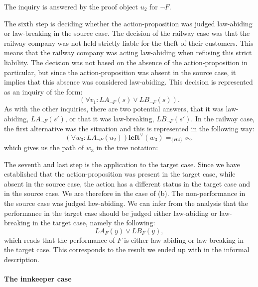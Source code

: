 			\noindent The inquiry is answered by the proof object $u_2$ for $\neg F$.
			
			The sixth step is deciding whether the action-proposition was judged law-abiding or law-breaking in the source case. The decision of the railway case was that the railway company was not held strictly liable for the theft of their customers. This means that the railway company was acting law-abiding when refusing this strict liability. The decision was not based on the absence of the action-proposition in particular, but since the action-proposition was absent in the source case, it implies that this absence was considered law-abiding. This decision is represented as an inquiry of the form:
				\[
					(\forall v_1 : LA_{\neg F}(s) \lor LB_{\neg F}(s)).
				\]
			As with the other inquiries, there are two potential answers, that it was law-abiding, $LA_{\neg F}(s')$, or that it was law-breaking, $LB_{\neg F}(s')$. In the railway case, the first alternative was the situation and this is represented in the following way:
				\[
					(\forall w_3 : LA_{\neg F}(u_2)) \textbf{left}^\lor (w_3) =_{\{H4\}} v_2,
				\]
			which gives us the path of $w_3$ in the tree notation: \newline
				\noindent\begin{minipage}{\textwidth}
				\end{minipage}\medskip
				
			The seventh and last step is the application to the target case. Since we have established that the action-proposition was present in the target case, while absent in the source case, the action has a different status in the target case and in the source case. We are therefore in the case of (b). The non-performance in the source case was judged law-abiding. We can infer from the analysis that the performance in the target case should be judged either law-abiding or law-breaking in the target case, namely the following:
				\[
					LA_F(y) \lor LB_F(y),
				\]	
			which reads that the performance of $F$ is either law-abiding or law-breaking in the target case. This corresponds to the result we ended up with in the informal description. 
			
		\paragraph{The innkeeper case}
			
